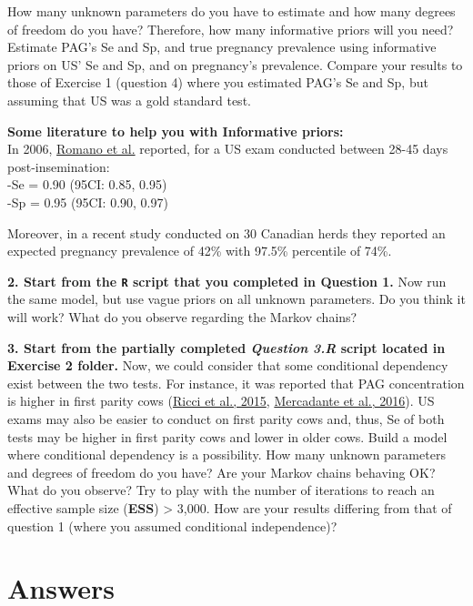 \documentclass[
]{book}
\begin{document}
How many unknown parameters do you have to estimate and how many degrees of freedom do you have? Therefore, how many informative priors will you need? Estimate PAG's Se and Sp, and true pregnancy prevalence using informative priors on US' Se and Sp, and on pregnancy's prevalence. Compare your results to those of Exercise 1 (question 4) where you estimated PAG's Se and Sp, but assuming that US was a gold standard test.

\textbf{Some literature to help you with Informative priors:}\\
In 2006, \href{https://www.sciencedirect.com/science/article/pii/S0093691X06001543?via\%3Dihub}{Romano et al.} reported, for a US exam conducted between 28-45 days post-insemination:\\
-Se = 0.90 (95CI: 0.85, 0.95)\\
-Sp = 0.95 (95CI: 0.90, 0.97)

Moreover, in a recent study conducted on 30 Canadian herds they reported an expected pregnancy prevalence of 42\% with 97.5\% percentile of 74\%.

\textbf{2. Start from the \texttt{R} script that you completed in Question 1.} Now run the same model, but use vague priors on all unknown parameters. Do you think it will work? What do you observe regarding the Markov chains?

\textbf{3. Start from the partially completed \emph{Question 3.R} script located in Exercise 2 folder.} Now, we could consider that some conditional dependency exist between the two tests. For instance, it was reported that PAG concentration is higher in first parity cows (\href{https://doi.org/10.3168/jds.2014-8974}{Ricci et al., 2015}, \href{https://doi.org/10.3168/jds.2015-10595}{Mercadante et al., 2016}). US exams may also be easier to
conduct on first parity cows and, thus, Se of both tests may be higher in first parity cows and lower in older cows. Build a model where conditional dependency is a possibility. How many unknown parameters and degrees of freedom do you have? Are your Markov chains behaving OK? What do you observe? Try to play with the number of iterations to reach an effective sample size (\textbf{ESS}) \textgreater{} 3,000. How are your results differing from that of question 1 (where you assumed conditional independence)?

\section{Answers}\label{answers-1}
\end{document}
